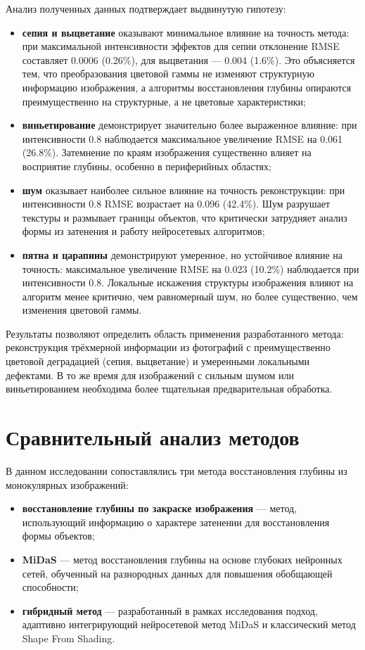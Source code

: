 Анализ полученных данных подтверждает выдвинутую гипотезу:

\begin{itemize}
    \item \textbf{сепия и выцветание} оказывают минимальное влияние на точность метода:
    при максимальной интенсивности эффектов для сепии отклонение RMSE составляет 0.0006 (0.26\%), для выцветания — 0.004 (1.6\%).
    Это объясняется тем, что преобразования цветовой гаммы не изменяют структурную информацию изображения, а алгоритмы восстановления глубины опираются преимущественно на структурные, а не цветовые характеристики;

    \item \textbf{виньетирование} демонстрирует значительно более выраженное влияние:
    при интенсивности 0.8 наблюдается максимальное увеличение RMSE на 0.061 (26.8\%).
    Затемнение по краям изображения существенно влияет на восприятие глубины, особенно в периферийных областях;

    \item \textbf{шум} оказывает наиболее сильное влияние на точность реконструкции:
    при интенсивности 0.8 RMSE возрастает на 0.096 (42.4\%).
    Шум разрушает текстуры и размывает границы объектов, что критически затрудняет анализ формы из затенения и работу нейросетевых алгоритмов;

    \item \textbf{пятна и царапины} демонстрируют умеренное, но устойчивое влияние на точность:
    максимальное увеличение RMSE на 0.023 (10.2\%) наблюдается при интенсивности 0.8.
    Локальные искажения структуры изображения влияют на алгоритм менее критично, чем равномерный шум, но более существенно, чем изменения цветовой гаммы.
\end{itemize}

Результаты позволяют определить область применения разработанного метода:
реконструкция трёхмерной информации из фотографий с преимущественно цветовой деградацией (сепия, выцветание) и умеренными локальными дефектами.
В то же время для изображений с сильным шумом или виньетированием необходима более тщательная предварительная обработка.

\section{Сравнительный анализ методов}

В данном исследовании сопоставлялись три метода восстановления глубины из монокулярных изображений:
\begin{itemize}
    \item \textbf{восстановление глубины по закраске изображения} --- метод, использующий информацию о характере затенении для восстановления формы объектов;
    \item \textbf{MiDaS} --- метод восстановления глубины на основе глубоких нейронных сетей, обученный на разнородных данных для повышения обобщающей способности;
    \item \textbf{гибридный метод} --- разработанный в рамках исследования подход, адаптивно интегрирующий нейросетевой метод MiDaS и классический метод Shape From Shading.
\end{itemize}

